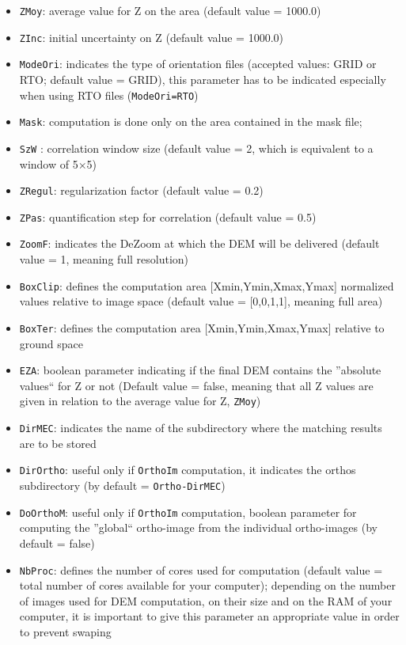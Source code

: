 \begin{itemize}
  \item {\tt ZMoy}: average value for Z on the area (default value = 1000.0)
  \item {\tt ZInc}: initial uncertainty on Z (default value = 1000.0)
  \item {\tt ModeOri}: indicates the type of orientation files (accepted values: GRID or RTO; default value = GRID), this parameter has to be indicated especially when using RTO files ({\tt ModeOri=RTO})
  \item {\tt Mask}: computation is done only on the area contained in the mask file;
  \item {\tt SzW} : correlation window size (default value = 2, which is equivalent to a window of 5$\times$5)
  \item {\tt ZRegul}: regularization factor (default value = 0.2)
  \item {\tt ZPas}: quantification step for correlation (default value = 0.5)
  \item {\tt ZoomF}: indicates the DeZoom at which the DEM will be delivered (default value = 1, meaning full resolution)
  \item {\tt BoxClip}: defines the computation area [Xmin,Ymin,Xmax,Ymax] normalized values relative to image space (default value = [0,0,1,1], meaning full area)
  \item {\tt BoxTer}: defines the computation area [Xmin,Ymin,Xmax,Ymax] relative to ground space
  \item {\tt EZA}: boolean parameter indicating if the final DEM contains the ''absolute values`` for Z or not (Default value = false, meaning that all Z values are given in relation to the average value for Z, {\tt ZMoy})
  \item {\tt DirMEC}: indicates the name of the subdirectory where the matching results are to be stored
  \item {\tt DirOrtho}: useful only if {\tt OrthoIm} computation, it indicates the orthos subdirectory (by default = {\tt Ortho-{DirMEC}})
  \item {\tt DoOrthoM}: useful only if {\tt OrthoIm} computation, boolean parameter for computing the ''global`` ortho-image from the individual ortho-images (by default = false)
  \item {\tt NbProc}: defines the number of cores used for computation (default value = total number of cores available for your computer); depending on the number of images used for DEM computation, on their size and on the RAM of your computer, it is important to give this parameter an appropriate value in order to prevent swaping
\end{itemize}

